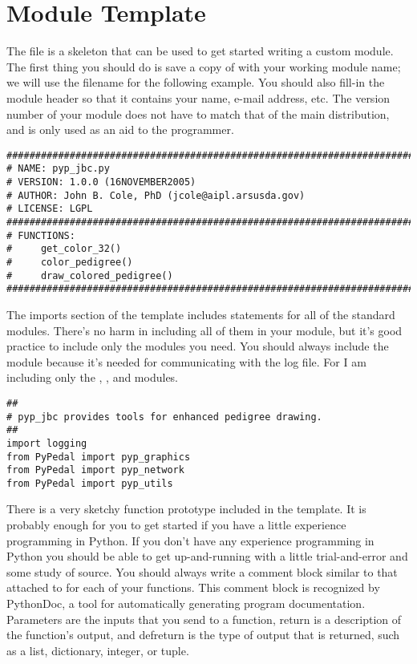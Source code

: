 \section{Module Template}
\label{sec:newfeatures-template}
The file  is a skeleton that can be used to get started writing a custom module.  The first thing you should do is save a copy of  with your working module name; we will use the filename  for the following example.  You should also fill-in the module header so that it contains your name, e-mail address, etc.  The version number of your module does not have to match that of the main \PyPedal{} distribution, and is only used as an aid to the programmer.
\begin{verbatim}
###############################################################################
# NAME: pyp_jbc.py
# VERSION: 1.0.0 (16NOVEMBER2005)
# AUTHOR: John B. Cole, PhD (jcole@aipl.arsusda.gov)
# LICENSE: LGPL
###############################################################################
# FUNCTIONS:
#     get_color_32()
#     color_pedigree()
#     draw_colored_pedigree()
###############################################################################
\end{verbatim}
The imports section of the template includes  statements for all of the standard \PyPedal{} modules.  There's
no harm in including all of them in your module, but it's good practice to include only the modules you need. You should
always include the  module because it's needed for communicating with the log file.  For 
I am including only the , , and  modules.
\begin{verbatim}
##
# pyp_jbc provides tools for enhanced pedigree drawing.
##
import logging
from PyPedal import pyp_graphics
from PyPedal import pyp_network
from PyPedal import pyp_utils
\end{verbatim}
There is a very sketchy function prototype included in the template.  It is probably enough for you to get started if you have
a little experience programming in Python.  If you don't have any experience programming in Python you should be able to get
up-and-running with a little trial-and-error and some study of \PyPedal{} source.  You should always write a comment block similar to that attached to  for each of your functions.  This comment block is recognized by PythonDoc, a tool for automatically generating program documentation.  Parameters are the inputs that you send to a function, return is a description of the function's output, and defreturn is the type of output that is returned, such as a list, dictionary, integer, or tuple.

